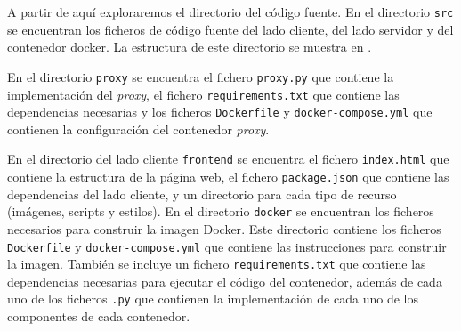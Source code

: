 A partir de aquí exploraremos el directorio del \gls{código fuente}. En el directorio \texttt{src} se encuentran los ficheros de \gls{código fuente} del lado cliente, del lado servidor y del \gls{contenedor} docker. La estructura de este directorio se muestra en .

\begin{figure}[htb]
    {
    \begin{tcolorbox}
    \end{tcolorbox}
    }
\end{figure}
En el directorio \texttt{proxy} se encuentra el fichero \texttt{proxy.py} que contiene la implementación del \textit{\gls{proxy}}, el fichero \texttt{requirements.txt} que contiene las dependencias necesarias y los ficheros \texttt{Dockerfile} y \texttt{docker-compose.yml} que contienen la configuración del \gls{contenedor} \textit{\gls{proxy}}.

En el directorio del lado cliente \texttt{frontend} se encuentra el fichero \texttt{index.html} que contiene la estructura de la página web, el fichero \texttt{package.json} que contiene las dependencias del lado cliente, y un directorio para cada tipo de recurso (imágenes, scripts y estilos). 
En el directorio \texttt{docker} se encuentran los ficheros necesarios para construir la \gls{imagen Docker}. Este directorio contiene los ficheros \texttt{Dockerfile} y \texttt{docker-compose.yml} que contiene las instrucciones para construir la imagen. También se incluye un fichero \texttt{requirements.txt} que contiene las dependencias necesarias para ejecutar el código del \gls{contenedor}, además de cada uno de los ficheros \texttt{.py} que contienen la implementación de cada uno de los componentes de cada \gls{contenedor}.  

